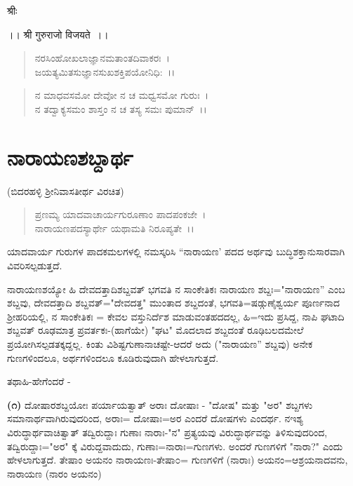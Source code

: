 

\begin{center}
श्रीः
\end{center}

\begin{center}
।। श्री गुरुराजो विजयते~।।
\end{center}

\begin{verse}
ನರಸಿಂಹೋಖಲಾಜ್ಞಾನಮತಾಂತದಿವಾಕರಃ~।\\ ಜಯತ್ಯಮಿತಸುಜ್ಞಾನಸುಖಶಕ್ತಿಪಯೋನಿಧಿ:~।।
\end{verse}

\begin{verse}
ನ ಮಾಧವಸಮೋ ದೇವೋ ನ ಚ ಮಧ್ವಸಮೋ ಗುರುಃ~।\\ ನ ತದ್ವಾಕ್ಯಸಮಂ ಶಾಸ್ತಂ ನ ಚ ತಸ್ಯ ಸಮಃ ಪುಮಾನ್~।।
\end{verse}

\chapter{ನಾರಾಯಣಶಬ್ದಾರ್ಥ}

\begin{center}
(ಬಿದರಹಳ್ಳಿ ಶ‍್ರೀನಿವಾಸತೀರ್ಥ ವಿರಚಿತ)
\end{center}

\begin{verse}
 ಪ್ರಣಮ್ಯ ಯಾದವಾಚಾರ್ಯಗುರೂಣಾಂ ಪಾದಪಂಕಜೇ~।\\ ನಾರಾಯಣಪದಸ್ಯಾರ್ಥೇ ಯಥಾಮತಿ ನಿರೂಪ್ಯತೇ~।।
\end{verse}

ಯಾದವಾರ್ಯ ಗುರುಗಳ ಪಾದಕಮಲಗಳಲ್ಲಿ ನಮಸ್ಕರಿಸಿ “ನಾರಾಯಣ' ಪದದ ಅರ್ಥವು ಬುದ್ಧಿಶಕ್ತಾನುಸಾರವಾಗಿ ವಿವರಿಸಲ್ಪಡುತ್ತದೆ.

ನಾರಾಯಣಶಯ್ಯೋ ಹಿ ದೇವದತ್ತಾದಿಶಬ್ದವತ್ ಭಗವತಿ ನ ಸಾಂಕೇತಿಕಃ ನಾರಾಯಣ ಶಬ್ದಃ="ನಾರಾಯಣ'' ಎಂಬ ಶಬ್ದವು, ದೇವದತ್ತಾದಿ ಶಬ್ದವತ್="ದೇವದತ್ತ" ಮುಂತಾದ ಶಬ್ದದಂತೆ, ಭಗವತಿ=ಷಡ್ಗುಣೈಶ್ವರ್ಯ ಪೂರ್ಣನಾದ ಶ‍್ರೀಹರಿಯಲ್ಲಿ, ನ ಸಾಂಕೇತಿಕಃ = ಕೇವಲ ವಸ್ತುನಿರ್ದೆಶ ಮಾಡುವಂತಹದದಲ್ಲ, ಹಿ=ಇದು ಪ್ರಸಿದ್ದ, ನಾಪಿ ಘಟಾದಿ ಶಬ್ದವತ್ ರೂಢಮಾತ್ರ ಪ್ರವರ್ತಕಃ-(ಹಾಗೆಯೇ) "ಘಟ" ಮೊದಲಾದ ಶಬ್ದದಂತೆ ರೂಢಿಬಲದಮೇಲೆ ಪ್ರಯೋಗಿಸಲ್ಪಡತಕ್ಕದ್ದಲ್ಲ. ಕಿಂತು ವಿಶಿಷ್ಟಗುಣಾನಾಚಷ್ಟೇ-ಆದರೆ ಅದು ("ನಾರಾಯಣ'' ಶಬ್ದವು) ಅನೇಕ ಗುಣಗಳಿಂದಲೂ, ಅರ್ಥಗಳಿಂದಲೂ ಕೂಡಿರುವುದಾಗಿ ಹೇಳಲಾಗುತ್ತದೆ.

\noindent
ತಥಾಹಿ-ಹೇಗೆಂದರೆ -

\textbf{(೧)} ದೋಷಾರಶಬ್ದಯೋಃ ಪರ್ಯಾಯತ್ವಾತ್ ಅರಾಃ ದೋಷಾಃ - "ದೋಷ" ಮತ್ತು "ಅರ" ಶಬ್ದಗಳು ಸಮಾನಾರ್ಥವಾಗಿರುವುದರಿಂದ, ಅರಾಃ= ದೋಷಾಃ=ಅರ ಎಂದರೆ ದೋಷಗಳು ಎಂದರ್ಥ. ನಇಶ್ಯ ವಿರುದ್ಧಾರ್ಥವಾಚಿತ್ವಾತ್ ತದ್ವಿರುದ್ದಾಃ ಗುಣಾಃ ನಾರಾಃ-"ನ" ಪ್ರತ್ಯಯವು ವಿರುದ್ಧಾರ್ಥವನ್ನು ತಿಳಿಸುವುದರಿಂದ, ತದ್ವಿರುದ್ದಾಃ="ಅರ" ಕ್ಕೆ ವಿರುದ್ದವಾದುದು, ಗುಣಾಃ=ನಾರಾಃ=ಗುಣಗಳು. ಅಂದರೆ ಗುಣಗಳಿಗೆ "ನಾರಾ?" ಎಂದು ಹೇಳಲಾಗುತ್ತದೆ. ತೇಷಾಂ ಅಯನಂ ನಾರಾಯಣಃ-ತೇಷಾ೦= ಗುಣಗಳಿಗೆ (ನಾರಾಃ) ಅಯನಂ=ಆಶ್ರಯನಾದವನು, ನಾರಾಯಣ (ನಾರಂ ಅಯನಂ)

